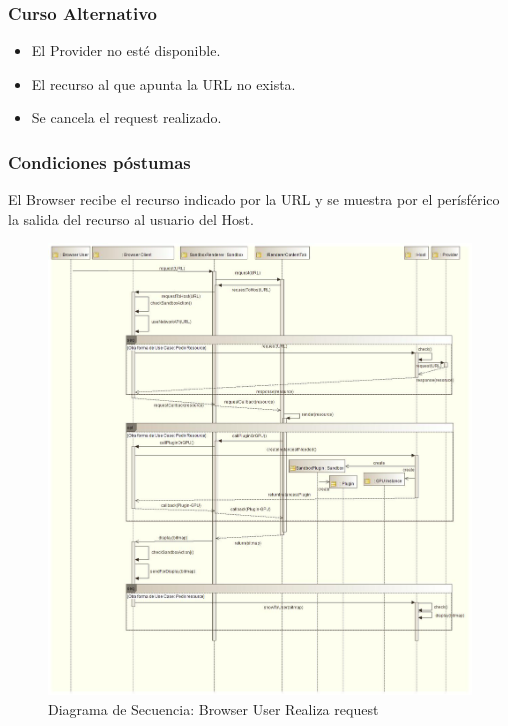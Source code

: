 \subsubsection{Curso Alternativo} 
\begin{itemize}
\item El Provider no esté disponible.
\item El recurso al que apunta la URL no exista.
\item Se cancela el request realizado.
	\end{itemize}
\subsubsection{Condiciones póstumas} El Browser recibe el recurso indicado por la URL y se muestra por el perísférico la salida del recurso al usuario del Host.
	    \begin{figure}[h]
	        \centering
	        \includegraphics[scale=0.35]{figures/chap4/requestResource.jpg}
	        \caption{Diagrama de Secuencia: Browser User Realiza request}
	        \label{fig:SecReq}
	    \end{figure}
